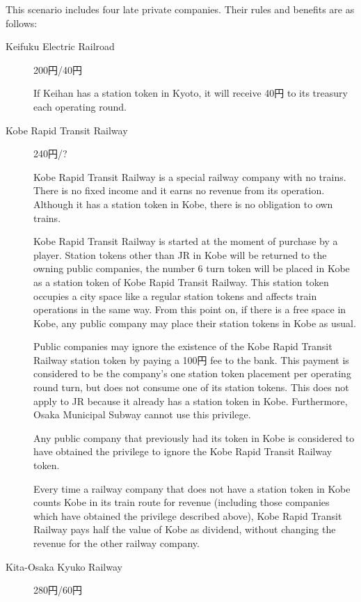 \begin{multicols}{2}
This scenario includes four late private companies. Their rules and
benefits are as follows:

\begin{description}
\item[Keifuku Electric Railroad] \hfill 200円/40円

  If Keihan has a station token in Kyoto, it will receive 40円 to
  its treasury each operating round.

\item[Kobe Rapid Transit ​​Railway] \hfill 240円/? \label{kobe}

  Kobe Rapid Transit Railway is a special railway company with no
  trains. There is no fixed income and it earns no revenue from its
  operation. Although it has a station token in Kobe, there is no
  obligation to own trains.

  Kobe Rapid Transit Railway is started at the moment of purchase by a
  player. Station tokens other than JR in Kobe will be returned to the
  owning public companies, the number 6 turn token will be placed in
  Kobe as a station token of Kobe Rapid Transit Railway. This station
  token occupies a city space like a regular station tokens and
  affects train operations in the same way. From this point on, if
  there is a free space in Kobe, any public company may place their
  station tokens in Kobe as usual.

  Public companies may ignore the existence of the Kobe Rapid Transit
  Railway station token by paying a 100円 fee to the bank. This
  payment is considered to be the company's one station token
  placement per operating round turn, but does not consume one of its
  station tokens. This does not apply to JR because it already has a
  station token in Kobe. Furthermore, Osaka Municipal Subway cannot
  use this privilege.

  Any public company that previously had its token in Kobe is
  considered to have obtained the privilege to ignore the Kobe Rapid
  Transit Railway token.

  Every time a railway company that does not have a station token in
  Kobe counts Kobe in its train route for revenue (including those
  companies which have obtained the privilege described above), Kobe
  Rapid Transit Railway pays half the value of Kobe as dividend,
  without changing the revenue for the other railway company.

\item[Kita-Osaka Kyuko Railway] \hfill 280円/60円


\end{description}
\end{multicols}
